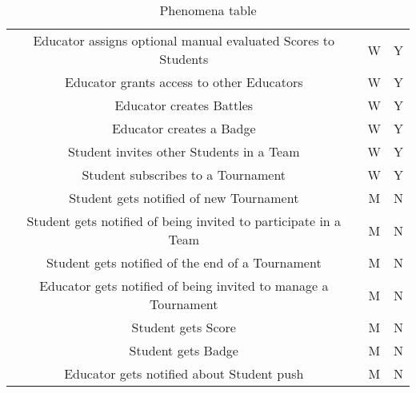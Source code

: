 \begin{center}
\begin{table}[h]
\begin{tabularx}{\textwidth}{| c| c| c|}
            Educator assigns optional manual evaluated Scores to Students         & W                & Y          \\
            Educator grants access to other Educators                             & W                & Y          \\
            Educator creates Battles                                              & W                & Y          \\
            Educator creates a Badge                                              & W                & Y          \\
            Student invites other Students in a Team                              & W                & Y          \\
            Student subscribes to a Tournament                                    & W                & Y          \\
            Student gets notified of new Tournament                               & M                & N          \\
            Student gets notified of being invited to participate in a Team       & M                & N          \\
            Student gets notified of the end of a Tournament                      & M                & N          \\
            Educator gets notified of being invited to manage a Tournament        & M                & N          \\
            Student gets Score                                                    & M                & N          \\
            Student gets Badge                                                    & M                & N          \\
            Educator gets notified about Student push                             & M                & N          \\
            \hline
        \end{tabularx}
        \caption*{Phenomena table}
        \addtocounter{table}{-1}
    \end{table}
\end{center}

